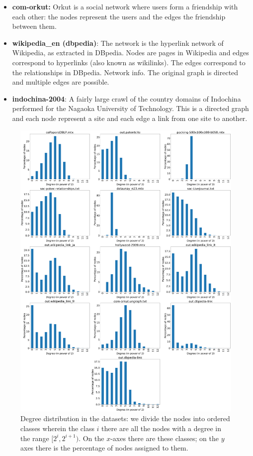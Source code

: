 \begin{itemize}
	\item \textbf{com-orkut:} Orkut is a social network where users form a friendship with each other: the nodes represent the users and the edges the friendship between them.
	\item \textbf{wikipedia\_en (dbpedia)}: The network is the hyperlink network of Wikipedia, as extracted in DBpedia. Nodes are pages in Wikipedia and edges correspond to hyperlinks (also known as wikilinks). The edges correspond to the relationships in DBpedia.
	Network info. The original graph is directed and multiple edges are possible.
	\item \textbf{indochina-2004}: A fairly large crawl of the country domains of Indochina performed for the Nagaoka University of Technology. This is a directed graph and each node represent a site and each edge a link from one site to another.
\end{itemize}

\begin{figure}
	\centering
	\includegraphics[width=1\linewidth]{0-resources/dataset-degree-distribution.png}
	\caption{Degree distribution in the datasets: we divide the nodes into ordered classes wherein the class $i$ there are all the nodes with a degree in the range $[2^i, 2^{i+1})$. On the $x$-axes there are these classes; on the $y$ axes there is the percentage of nodes assigned to them.}
	\label{fig:dataset-degree-distribution}
\end{figure}
\newpage
